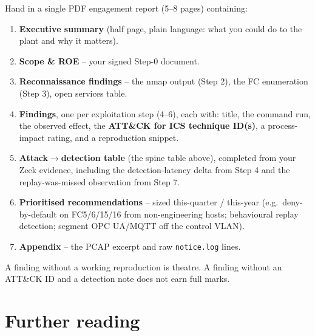 \documentclass[11pt,a4paper]{article}
\begin{document}
\begin{deliverbox}
Hand in a single PDF engagement report (5--8 pages) containing:
\begin{enumerate}\setlength{\itemsep}{1pt}
  \item \textbf{Executive summary} (half page, plain language: what you
        could do to the plant and why it matters).
  \item \textbf{Scope \& ROE} -- your signed Step-0 document.
  \item \textbf{Reconnaissance findings} -- the nmap output (Step 2),
        the FC enumeration (Step 3), open services table.
  \item \textbf{Findings}, one per exploitation step (4--6), each with:
        title, the command run, the observed effect, the
        \textbf{ATT\&CK for ICS technique ID(s)}, a process-impact
        rating, and a reproduction snippet.
  \item \textbf{Attack$\to$detection table} (the spine table above),
        completed from your Zeek evidence, including the
        detection-latency delta from Step 4 and the
        replay-was-missed observation from Step 7.
  \item \textbf{Prioritised recommendations} -- sized this-quarter /
        this-year (e.g.\ deny-by-default on FC5/6/15/16 from
        non-engineering hosts; behavioural replay detection;
        segment OPC UA/MQTT off the control VLAN).
  \item \textbf{Appendix} -- the PCAP excerpt and raw \texttt{notice.log}
        lines.
\end{enumerate}
A finding without a working reproduction is theatre. A finding without
an ATT\&CK ID and a detection note does not earn full marks.
\end{deliverbox}

\section*{Further reading}
\end{document}
